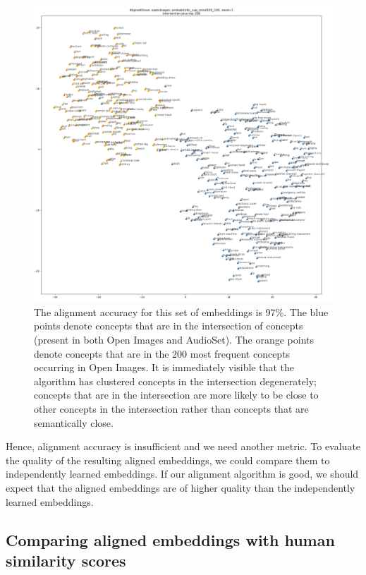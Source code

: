 \begin{figure}[H]
\label{fig:dysfunctional_clusters}
    \centering
    \includegraphics[width=1.0\textwidth]{images/method/probabilistic_aligned/dysfunctional_clusters.png}
    \caption{
        The alignment accuracy for this set of embeddings is 97\%. The blue points denote concepts that are in the intersection of concepts (present in both Open Images and AudioSet). The orange points denote concepts that are in the 200 most frequent concepts occurring in Open Images. It is immediately visible that the algorithm has clustered concepts in the intersection degenerately; concepts that are in the intersection are more likely to be close to other concepts in the intersection rather than concepts that are semantically close.
    }
\end{figure}

Hence, alignment accuracy is insufficient and we need another metric. To evaluate the quality of the resulting aligned embeddings, we could compare them to independently learned embeddings. If our alignment algorithm is good, we should expect that the aligned embeddings are of higher quality than the independently learned embeddings. 

\subsection{Comparing aligned embeddings with human similarity scores}

